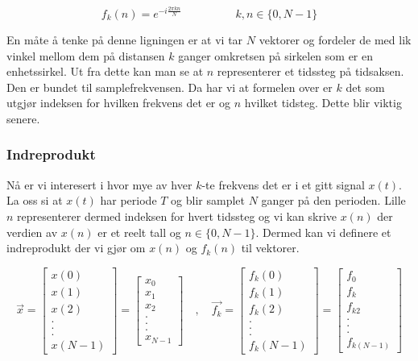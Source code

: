 \documentclass{article}
\begin{document}
            \[
                f_k(n) = e^{-i\frac{2\pi kn}{N}} \hspace{2cm} k,n \in \{0 , N-1\} 
            \]

            En måte å tenke på denne ligningen er at vi tar \(N\) vektorer og fordeler de med lik vinkel mellom dem på distansen \(k\) ganger omkretsen på sirkelen som er en enhetssirkel.
            Ut fra dette kan man se at \(n\) representerer et tidssteg på tidsaksen. 
            Den er bundet til samplefrekvensen.
            Da har vi at formelen over er \(k\) det som utgjør indeksen for hvilken frekvens det er og \(n\) hvilket tidsteg. Dette blir viktig senere.
        
        \subsubsection{Indreprodukt}
            Nå er vi interesert i hvor mye av hver \(k\)-te frekvens det er i et gitt signal \(x(t)\). 
            La oss si at \(x(t)\) har periode \(T\) og blir samplet \(N\) ganger på den perioden.
            Lille \(n\) representerer dermed indeksen for hvert tidssteg og vi kan skrive \(x(n)\) der verdien av \(x(n)\) er et reelt tall og \(n \in \{0,N-1\}\).
            Dermed kan vi definere et indreprodukt der vi gjør om \(x(n)\) og \(f_k(n)\) til vektorer.

            \[
            \vec{x} =
            \begin{bmatrix}
            x(0) \\ x(1) \\ x(2) \\ . \\ . \\ . \\ x(N-1)
            \end{bmatrix}
            =
            \begin{bmatrix}
            x_0 \\ x_1 \\ x_2 \\ . \\ . \\ . \\ x_{N-1}
            \end{bmatrix}
            \quad , \quad
            \vec{f_k} =
            \begin{bmatrix}
            f_k(0) \\ f_k(1) \\ f_k(2) \\ . \\ . \\ . \\ f_k(N-1)
            \end{bmatrix}
            =
            \begin{bmatrix}
                f_0 \\ f_k \\ f_{k2} \\ . \\ . \\ . \\ f_{k(N-1)}
            \end{bmatrix}
            \]
\end{document}
